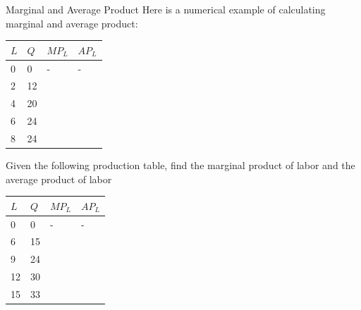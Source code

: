 \documentclass[11pt,t]{beamer}
\begin{document}
\begin{frame}{Marginal and Average Product}
  Here is a numerical example of calculating marginal and average product:

  \begin{center}
    \begin{spacing}{1.9}
      \begin{tabular}{ | l | l | l | l |}
        \hline
        $L$ & $Q$ & $MP_L$ & $AP_L$ \\ \hline
        0 & 0  & - & - \\ \hline
        2 & 12 &   &   \\ \hline
        4 & 20 &   &   \\ \hline
        6 & 24 &   &   \\ \hline
        8 & 24 &   &   \\
        \hline
      \end{tabular}
    \end{spacing}
  \end{center}
\end{frame}

\begin{frame}
  
  \bigskip
  Given the following production table, find the marginal product of labor and the average product of labor
  \begin{center}
    \begin{spacing}{1.9}
      \begin{tabular}{ | l | l | l | l |}
        \hline
        $L$ & $Q$ & $MP_L$ & $AP_L$ \\ \hline
        0  & 0  & - & - \\ \hline
        6  & 15 &   &   \\ \hline
        9  & 24 &   &   \\ \hline
        12 & 30 &   &   \\ \hline
        15 & 33 &   &   \\
        \hline
      \end{tabular}
    \end{spacing}
  \end{center}
\end{frame}
\end{document}
